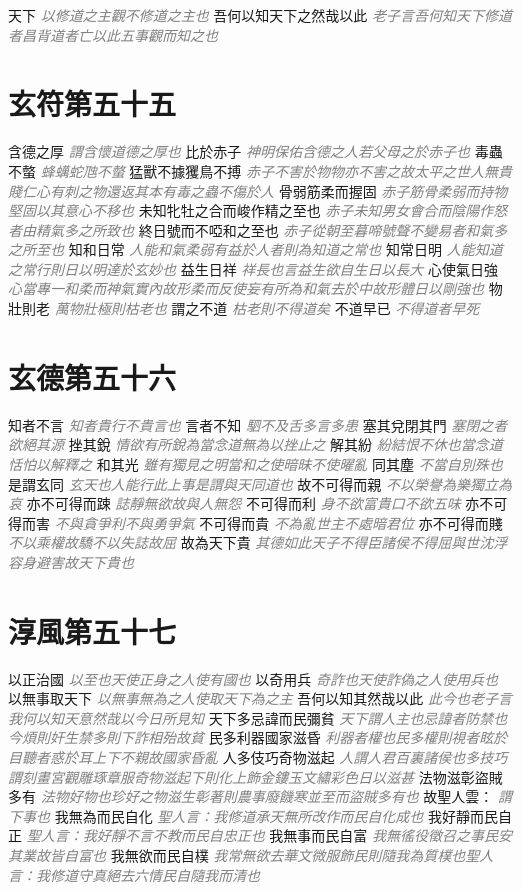 \documentclass[a4paper,zihao=-4,oneside,landscape,UTF8]{ctexart}
\newcommand{\zhushi}[1]{\scriptsize{\textit{\textcolor{gray}{#1}}}\normalsize}
\begin{document}
天下
\zhushi{以修道之主觀不修道之主也}
吾何以知天下之然哉以此
\zhushi{老子言吾何知天下修道者昌背道者亡以此五事觀而知之也}


\section{玄符第五十五}

含德之厚
\zhushi{謂含懷道德之厚也}
比於赤子
\zhushi{神明保佑含德之人若父母之於赤子也}
毒蟲不螫
\zhushi{蜂蠇蛇虺不螫}
猛獸不據玃鳥不搏
\zhushi{赤子不害於物物亦不害之故太平之世人無貴賤仁心有刺之物還返其本有毒之蟲不傷於人}
骨弱筋柔而握固
\zhushi{赤子筋骨柔弱而持物堅固以其意心不移也}
未知牝牡之合而峻作精之至也
\zhushi{赤子未知男女會合而陰陽作怒者由精氣多之所致也}
終日號而不啞和之至也
\zhushi{赤子從朝至暮啼號聲不變易者和氣多之所至也}
知和日常
\zhushi{人能和氣柔弱有益於人者則為知道之常也}
知常日明
\zhushi{人能知道之常行則日以明達於玄妙也}
益生日祥
\zhushi{祥長也言益生欲自生日以長大}
心使氣日強
\zhushi{心當專一和柔而神氣實內故形柔而反使妄有所為和氣去於中故形體日以剛強也}
物壯則老
\zhushi{萬物壯極則枯老也}
謂之不道
\zhushi{枯老則不得道矣}
不道早已
\zhushi{不得道者早死}


\section{玄德第五十六}

知者不言
\zhushi{知者貴行不貴言也}
言者不知
\zhushi{駟不及舌多言多患}
塞其兌閉其門
\zhushi{塞閉之者欲絕其源}
挫其銳
\zhushi{情欲有所銳為當念道無為以挫止之}
解其紛
\zhushi{紛結恨不休也當念道恬怕以解釋之}
和其光
\zhushi{雖有獨見之明當和之使暗昧不使曜亂}
同其塵
\zhushi{不當自別殊也}
是謂玄同
\zhushi{玄天也人能行此上事是謂與天同道也}
故不可得而親
\zhushi{不以榮譽為樂獨立為哀}
亦不可得而踈
\zhushi{誌靜無欲故與人無怨}
不可得而利
\zhushi{身不欲富貴口不欲五味}
亦不可得而害
\zhushi{不與貪爭利不與勇爭氣}
不可得而貴
\zhushi{不為亂世主不處暗君位}
亦不可得而賤
\zhushi{不以乘權故驕不以失誌故屈}
故為天下貴
\zhushi{其德如此天子不得臣諸侯不得屈與世沈浮容身避害故天下貴也}


\section{淳風第五十七}

以正治國
\zhushi{以至也天使正身之人使有國也}
以奇用兵
\zhushi{奇詐也天使詐偽之人使用兵也}
以無事取天下
\zhushi{以無事無為之人使取天下為之主}
吾何以知其然哉以此
\zhushi{此今也老子言我何以知天意然哉以今日所見知}
天下多忌諱而民彌貧
\zhushi{天下謂人主也忌諱者防禁也今煩則奸生禁多則下詐相殆故貧}
民多利器國家滋昏
\zhushi{利器者權也民多權則視者眩於目聽者惑於耳上下不親故國家昏亂}
人多伎巧奇物滋起
\zhushi{人謂人君百裏諸侯也多技巧謂刻畫宮觀雕琢章服奇物滋起下則化上飾金鏤玉文繡彩色日以滋甚}
法物滋彰盜賊多有
\zhushi{法物好物也珍好之物滋生彰著則農事廢饑寒並至而盜賊多有也}
故聖人雲：
\zhushi{謂下事也}
我無為而民自化
\zhushi{聖人言：我修道承天無所改作而民自化成也}
我好靜而民自正
\zhushi{聖人言：我好靜不言不教而民自忠正也}
我無事而民自富
\zhushi{我無徭役徵召之事民安其業故皆自富也}
我無欲而民自樸
\zhushi{我常無欲去華文微服飾民則隨我為質樸也聖人言：我修道守真絕去六情民自隨我而清也}
\end{document}
